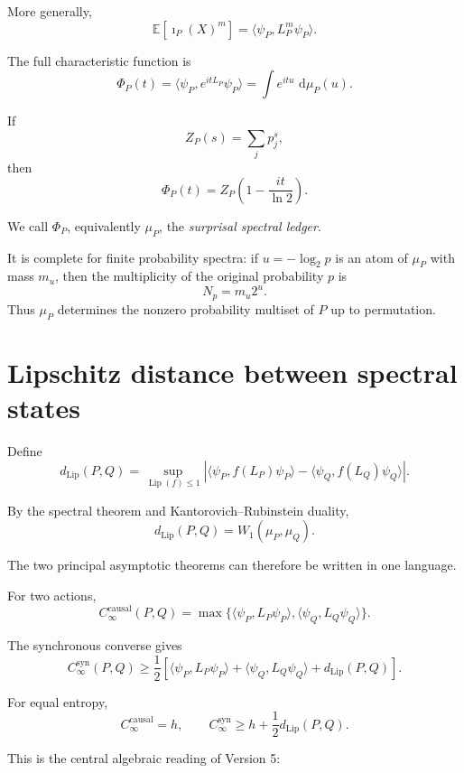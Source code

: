 \documentclass[11pt,a4paper]{article}
\newcommand{\CinfSyn}{C_{\infty}^{\mathrm{syn}}}
\newcommand{\CinfCausal}{C_{\infty}^{\mathrm{causal}}}
\newcommand{\E}{\mathbb E}
\newcommand{\1}{\mathbf 1}
\newcommand{\dd}{\,\mathrm d}
\newcommand{\ip}[2]{\langle #1,#2\rangle}
\begin{document}
More generally,
\[
\E[\imath_P(X)^m]
=
\ip{\psi_P}{L_P^m\psi_P}.
\tag{22.7}
\]

The full characteristic function is
\[
\boxed{
\Phi_P(t)
=
\ip{\psi_P}{e^{itL_P}\psi_P}
=
\int e^{itu}\,\dd\mu_P(u).
}
\tag{22.8}
\]

If
\[
Z_P(s)
=
\sum_jp_j^s,
\tag{22.9}
\]
then
\[
\boxed{
\Phi_P(t)
=
Z_P
\left(
1-\frac{it}{\ln2}
\right).
}
\tag{22.10}
\]

We call \(\Phi_P\), equivalently \(\mu_P\), the
\emph{surprisal spectral ledger}.

It is complete for finite probability spectra:
if \(u=-\log_2p\) is an atom of \(\mu_P\) with mass \(m_u\), then the
multiplicity of the original probability \(p\) is
\[
\boxed{
N_p=m_u2^u.
}
\tag{22.11}
\]
Thus \(\mu_P\) determines the nonzero probability multiset of \(P\) up
to permutation.


\section{Lipschitz distance between spectral states}

Define
\[
\boxed{
d_{\mathrm{Lip}}(P,Q)
=
\sup_{\operatorname{Lip}(f)\le1}
\left|
\ip{\psi_P}{f(L_P)\psi_P}
-
\ip{\psi_Q}{f(L_Q)\psi_Q}
\right|.
}
\tag{23.1}
\]

By the spectral theorem and Kantorovich--Rubinstein duality,
\[
\boxed{
d_{\mathrm{Lip}}(P,Q)
=
W_1(\mu_P,\mu_Q).
}
\tag{23.2}
\]

The two principal asymptotic theorems can therefore be written in one
language.

For two actions,
\[
\boxed{
\CinfCausal(P,Q)
=
\max
\{
\ip{\psi_P}{L_P\psi_P},
\ip{\psi_Q}{L_Q\psi_Q}
\}.
}
\tag{23.3}
\]

The synchronous converse gives
\[
\boxed{
\CinfSyn(P,Q)
\ge
\frac12
\left[
\ip{\psi_P}{L_P\psi_P}
+
\ip{\psi_Q}{L_Q\psi_Q}
+
d_{\mathrm{Lip}}(P,Q)
\right].
}
\tag{23.4}
\]

For equal entropy,
\[
\boxed{
\CinfCausal=h,
\qquad
\CinfSyn
\ge
h+\frac12d_{\mathrm{Lip}}(P,Q).
}
\tag{23.5}
\]

This is the central algebraic reading of Version 5:

\begin{center}
\end{center}
\end{document}
